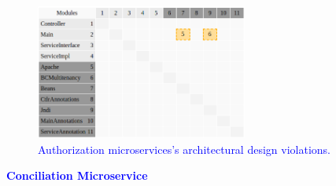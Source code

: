 \documentclass[12pt]{article}
\begin{document}
\begin{figure}[ht]
\centering
\includegraphics[width=0.62\textwidth]{figuras/violacoesAuthorization.png}
\caption{\textcolor{blue}{Authorization microservices's architectural design violations.}}
\label{fig:microservices}
\end{figure}

\noindent\textbf{\textcolor{blue}{Conciliation Microservice}}
\label{sec:ApendiceConciliation}


\end{document}
